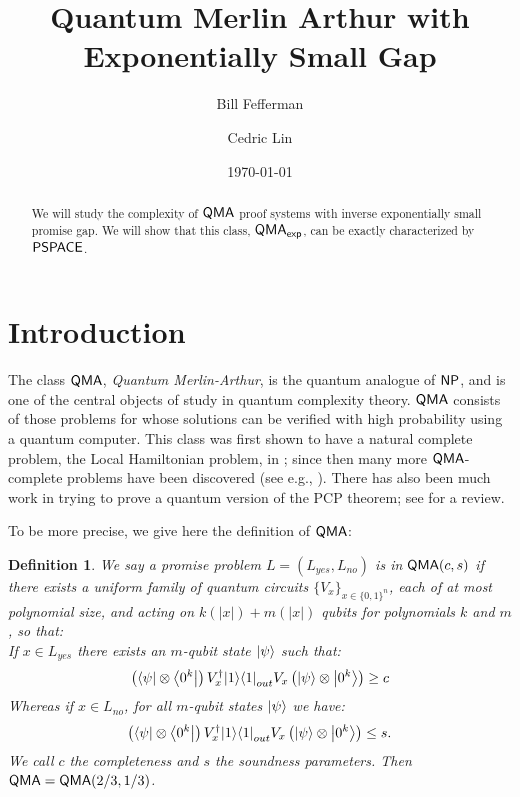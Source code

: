 \documentclass[11pt]{article}
\newtheorem{definition}{Definition}
\theoremstyle{definition}
\theoremstyle{remark}
\newcommand\QMA{{\sf{QMA}}}
\newcommand\PSPACE{{\sf{PSPACE}}}
\newcommand\NP{{\sf{NP}}}
\newcommand\QMAexp{{\sf{QMA}_{exp}}}
\begin{document}
\title{Quantum Merlin Arthur with Exponentially Small Gap}
\author[1]{Bill Fefferman}
\author[1]{Cedric Lin}
\date{\today}

\maketitle

\begin{abstract}
We will study the complexity of $\QMA$ proof systems with inverse exponentially small promise gap.  We will show that this class, $\QMAexp$, can be exactly characterized by $\PSPACE$.
\end{abstract}

\section{Introduction}
The class $\QMA$, \emph{Quantum Merlin-Arthur}, is the quantum analogue of $\NP$, and is one of the central objects of study in quantum complexity theory. $\QMA$ consists of those problems for whose solutions can be verified with high probability using a quantum computer. This class was first shown to have a natural complete problem, the Local Hamiltonian problem, in \cite{ksv02}; since then many more  $\QMA$-complete problems have been discovered (see e.g., \cite{bookatz14}). There has also been much work in trying to prove a quantum version of the PCP theorem; see \cite{qpcpsurvey} for a review.

To be more precise, we give here the definition of $\QMA$:
\begin{definition}We say a promise problem $L=(L_{yes},L_{no})$ is in $\QMA(c,s)$ if there exists a uniform family of quantum circuits $\{ V_x\}_{x\in\{0,1\}^n}$, each of at most polynomial size, and acting on $k(|x|)+m(|x|)$ qubits for polynomials $k$ and $m$, so that:\\

If $x \in L_{yes}$ there exists an $m$-qubit state ${\left\vert{\psi}\right\rangle}$ such that:
\begin{equation}
\left({\left\langle{\psi}\right\vert}\otimes {\left\langle{0^k}\right\vert}\right) V^\dagger_x {\left\vert{1}\right\rangle}{\left\langle{1}\right\vert}_{out} V_x \left({\left\vert{\psi}\right\rangle}\otimes {\left\vert{0^k}\right\rangle}\right) \ge c
\end{equation}
Whereas if $x \in L_{no}$, for all $m$-qubit states ${\left\vert{\psi}\right\rangle}$ we have:
\begin{equation}
\left({\left\langle{\psi}\right\vert}\otimes {\left\langle{0^k}\right\vert}\right) V^\dagger_x {\left\vert{1}\right\rangle}{\left\langle{1}\right\vert}_{out} V_x \left({\left\vert{\psi}\right\rangle}\otimes {\left\vert{0^k}\right\rangle}\right) \le s.
\end{equation}
We call $c$ the completeness and $s$ the soundness parameters. Then $\QMA = \QMA(2/3,1/3)$.
  \end{definition}
  
\end{document}
